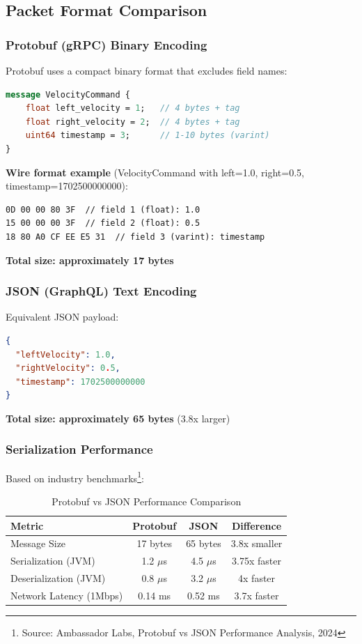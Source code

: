 \subsection{Packet Format Comparison}

\subsubsection{Protobuf (gRPC) Binary Encoding}

Protobuf uses a compact binary format that excludes field names:

\begin{lstlisting}[language=Protobuf, caption=Protobuf Message Definition]
message VelocityCommand {
    float left_velocity = 1;   // 4 bytes + tag
    float right_velocity = 2;  // 4 bytes + tag
    uint64 timestamp = 3;      // 1-10 bytes (varint)
}
\end{lstlisting}

\textbf{Wire format example} (VelocityCommand with left=1.0, right=0.5, timestamp=1702500000000):
\begin{verbatim}
0D 00 00 80 3F  // field 1 (float): 1.0
15 00 00 00 3F  // field 2 (float): 0.5
18 80 A0 CF EE E5 31  // field 3 (varint): timestamp
\end{verbatim}

\textbf{Total size: approximately 17 bytes}

\subsubsection{JSON (GraphQL) Text Encoding}

Equivalent JSON payload:
\begin{lstlisting}[language=json, caption=JSON Equivalent]
{
  "leftVelocity": 1.0,
  "rightVelocity": 0.5,
  "timestamp": 1702500000000
}
\end{lstlisting}

\textbf{Total size: approximately 65 bytes} (3.8x larger)

\subsubsection{Serialization Performance}

Based on industry benchmarks\footnote{Source: Ambassador Labs, Protobuf vs JSON Performance Analysis, 2024}:

\begin{table}[H]
\centering
\begin{tabular}{|l|c|c|c|}
\hline
\textbf{Metric} & \textbf{Protobuf} & \textbf{JSON} & \textbf{Difference} \\
\hline
Message Size & 17 bytes & 65 bytes & 3.8x smaller \\
Serialization (JVM) & 1.2 $\mu$s & 4.5 $\mu$s & 3.75x faster \\
Deserialization (JVM) & 0.8 $\mu$s & 3.2 $\mu$s & 4x faster \\
Network Latency (1Mbps) & 0.14 ms & 0.52 ms & 3.7x faster \\
\hline
\end{tabular}
\caption{Protobuf vs JSON Performance Comparison}
\end{table}
